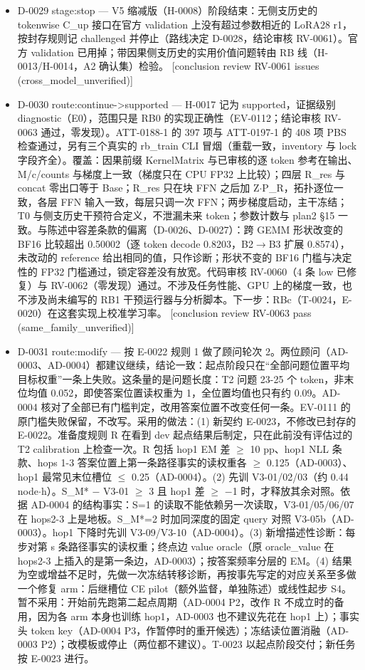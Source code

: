 \documentclass[11pt]{article}
\begin{document}
\begin{itemize}
\item D-0029 stage:stop --- V5 缩减版（H-0008）阶段结束：无侧支历史的 tokenwise C\_up 接口在官方 validation 上没有超过参数相近的 LoRA28 r1，按封存规则记 challenged 并停止（路线决定 D-0028，结论审核 RV-0061）。官方 validation 已用掉；带因果侧支历史的实用价值问题转由 RB 线（H-0013/H-0014，A2 确认集）检验。 [conclusion review RV-0061 issues (cross\_model\_unverified)]
\item D-0030 route:continue-\textgreater{}supported --- H-0017 记为 supported，证据级别 diagnostic（E0），范围只是 RB0 的实现正确性（EV-0112；结论审核 RV-0063 通过，零发现）。ATT-0188-1 的 397 项与 ATT-0197-1 的 408 项 PBS 检查通过，另有三个真实的 rb\_train CLI 冒烟（重载一致，inventory 与 lock 字段齐全）。覆盖：因果前缀 KernelMatrix 与已审核的逐 token 参考在输出、M/c/counts 与梯度上一致（梯度只在 CPU FP32 上比较）；四层 R\_res 与 concat 零出口等于 Base；R\_res 只在块 FFN 之后加 Z\ensuremath{\cdot}P\_R，拓扑逐位一致，各层 FFN 输入一致，每层只调一次 FFN；两步梯度启动，主干冻结；T0 与侧支历史干预符合定义，不泄漏未来 token；参数计数与 plan2 §15 一致。与陈述中容差条款的偏离（D-0026、D-0027）：跨 GEMM 形状改变的 BF16 比较超出 0.50002（逐 token decode 0.8203，B2\ensuremath{\rightarrow}B3 扩展 0.8574），未改动的 reference 给出相同的值，只作诊断；形状不变的 BF16 门槛与决定性的 FP32 门槛通过，锁定容差没有放宽。代码审核 RV-0060（4 条 low 已修复）与 RV-0062（零发现）通过。不涉及任务性能、GPU 上的梯度一致，也不涉及尚未编写的 RB1 干预运行器与分析脚本。下一步：RBc（T-0024，E-0020）在这套实现上校准学习率。 [conclusion review RV-0063 pass (same\_family\_unverified)]
\item D-0031 route:modify --- 按 E-0022 规则 1 做了顾问轮次 2。两位顾问（AD-0003、AD-0004）都建议继续，结论一致：起点阶段只在``全部问题位置平均目标权重''一条上失败。这条量的是问题长度：T2 问题 23-25 个 token，非末位均值 0.052，即使答案位置读权重为 1，全位置均值也只有约 0.09。AD-0004 核对了全部已有门槛判定，改用答案位置不改变任何一条。EV-0111 的原门槛失败保留，不改写。采用的做法：(1) 新契约 E-0023，不修改已封存的 E-0022。准备度规则 R 在看到 dev 起点结果后制定，只在此前没有评估过的 T2 calibration 上检查一次。R 包括 hop1 EM 差 \ensuremath{\geq} 10 pp、hop1 NLL 条款、hops 1-3 答案位置上第一条路径事实的读权重各 \ensuremath{\geq} 0.125（AD-0003）、hop1 最常见末位槽位 \ensuremath{\leq} 0.25（AD-0004）。(2) 先训 V3-01/02/03（约 0.44 node\ensuremath{\cdot}h）。S\_M* \ensuremath{-} V3-01 \ensuremath{\geq} 3 且 hop1 差 \ensuremath{\geq} \ensuremath{-}1 时，才释放其余对照。依据 AD-0004 的结构事实：S=1 的读取不能依赖另一次读取，V3-01/05/06/07 在 hops2-3 上是地板。S\_M*=2 时加同深度的固定 query 对照 V3-05b（AD-0003）。hop1 下降时先训 V3-09/V3-10（AD-0004）。(3) 新增描述性诊断：每步对第 s 条路径事实的读权重；终点边 value oracle（原 oracle\_value 在 hops2-3 上插入的是第一条边，AD-0003）；按答案频率分层的 EM。(4) 结果为空或增益不足时，先做一次冻结转移诊断，再按事先写定的对应关系至多做一个修复 arm：后继槽位 CE pilot（额外监督，单独陈述）或线性起步 S4。暂不采用：开始前先跑第二起点周期（AD-0004 P2，改作 R 不成立时的备用，因为各 arm 本身也训练 hop1，AD-0003 也不建议先花在 hop1 上）；事实头 token key（AD-0004 P3，作暂停时的重开候选）；冻结读位置消融（AD-0003 P2）；改模板或停止（两位都不建议）。T-0023 以起点阶段交付；新任务按 E-0023 进行。

\end{itemize}
\end{document}
